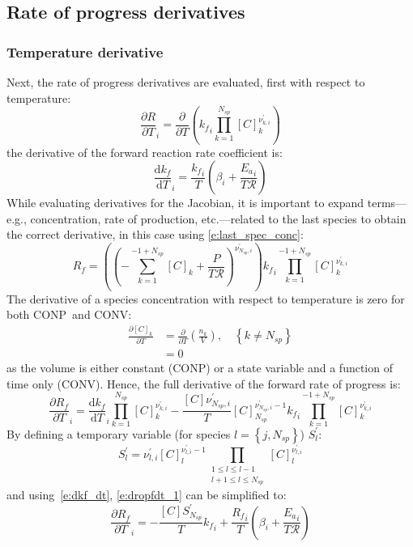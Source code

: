 \documentclass[12pt]{article}
\newcommand{\ns}{N_{sp}}
\newcommand{\conp}{CONP}
\newcommand{\conv}{CONV}
\newcommand{\Ru}{\mathcal{R}}
\begin{document}
\subsection{Rate of progress derivatives}
\subsubsection{Temperature derivative}
Next, the rate of progress derivatives are evaluated, first with respect to temperature:
\begin{equation}
 \frac{\partial R }{\partial T }_{i} = \frac{\partial}{\partial T}\left({k_f}_{i} \prod_{k=1}^{\ns} [C]_{k}^{\nu^{\prime}_{k,i}}\right)
\end{equation}
the derivative of the forward reaction rate coefficient is:
\begin{equation}
 \label{e:dkf_dt}
 \frac{\text{d} {k_f} }{\text{d} T }_{i} = \frac{{k_f}_{i}}{T} \left(\beta_{i} + \frac{{E_{a}}_{i}}{T \Ru}\right)
\end{equation}
While evaluating derivatives for the Jacobian, it is important to expand terms---e.g., concentration, rate of production, etc.---related to the last species to obtain the correct derivative, in this case using \cref{e:last_spec_conc}:
\begin{equation}
 {R_f} = \left(\left(- \sum_{k=1}^{-1 + \ns} [C]_{k} + \frac{P}{T \Ru}\right)^{\nu^{\prime}_{\ns,i}}\right) {k_f}_{i} \prod_{k=1}^{-1 + \ns} [C]_{k}^{\nu^{\prime}_{k,i}}
\end{equation}
The derivative of a species concentration with respect to temperature is zero for both \conp~and \conv:
\begin{align}
 \frac{\partial [C]_{k}}{\partial T} &= \frac{\partial}{\partial T} \left(\frac{n_k}{V}\right), \quad \left\{k \ne \ns\right\} \nonumber \\
				     &= 0
\end{align}
as the volume is either constant (\conp) or a state variable and a function of time only (\conv).
Hence, the full derivative of the forward rate of progress is:
\begin{equation}
 \label{e:dropfdt_1}
 \frac{\partial {R_f} }{\partial T }_{i} = \frac{\text{d} {k_f} }{\text{d} T }_{i} \prod_{k=1}^{\ns} [C]_{k}^{\nu^{\prime}_{k,i}} - \frac{[C] \nu^{\prime}_{\ns,i}}{T} [C]_{\ns}^{\nu^{\prime}_{\ns,i} - 1} {k_f}_{i} \prod_{k=1}^{-1 + \ns} [C]_{k}^{\nu^{\prime}_{k,i}}
\end{equation}
By defining a temporary variable (for species $l = \left\{j, \ns\right\}$) $S^{\prime}_{l}$:
\begin{equation}
 \label{e:s_temp}
 S^{\prime}_{l} = \nu^{\prime}_{l,i} [C]_{l}^{\nu^{\prime}_{l,i} - 1} \prod_{\substack{1 \leq l \leq l - 1\\l + 1 \leq l \leq \ns}} [C]_{l}^{\nu^{\prime}_{l,i}}
\end{equation}
and using~\cref{e:dkf_dt}, \cref{e:dropfdt_1} can be simplified to:
\begin{equation}
 \label{e:dropf_dt}
 \frac{\partial {R_f} }{\partial T }_{i} = - \frac{[C] S^{\prime}_{\ns}}{T} {k_f}_{i} + \frac{{R_f}_{i}}{T} \left(\beta_{i} + \frac{{E_{a}}_{i}}{T \Ru}\right)
\end{equation}
\end{document}
